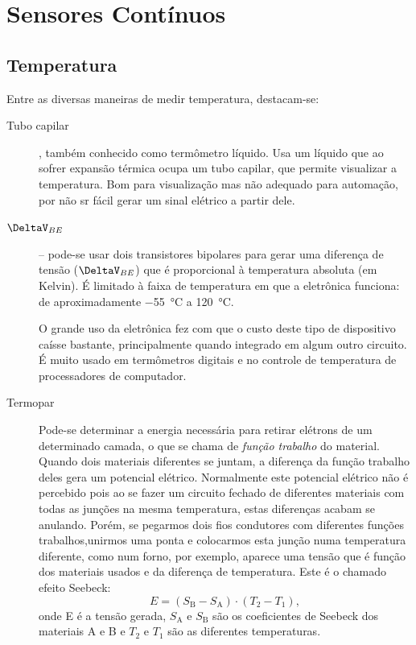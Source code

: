 \section{Sensores Contínuos}

\subsection{Temperatura}
Entre as diversas maneiras de medir temperatura, destacam-se:
\begin{description}
  \item[Tubo capilar], também conhecido como termômetro líquido. Usa um líquido que ao sofrer expansão térmica ocupa um tubo capilar, que permite visualizar a temperatura. Bom para visualização mas não adequado para automação, por não sr fácil gerar um sinal elétrico a partir dele.

  \item[$\DeltaV_{BE}$] -- pode-se usar dois transistores bipolares para gerar uma diferença de tensão ($\DeltaV_{BE}$) que é proporcional à temperatura absoluta (em Kelvin). É limitado à faixa de temperatura em que a eletrônica funciona: de aproximadamente \SI{-55}{\celsius} a \SI{120}{\celsius}.

  O grande uso da eletrônica fez com que o custo deste tipo de dispositivo caísse bastante, principalmente quando integrado em algum outro circuito. É muito usado em termômetros digitais e no controle de temperatura de processadores de computador.

  \item[Termopar] Pode-se determinar a energia necessária para retirar elétrons de um determinado camada, o que se chama de \emph{função trabalho} do material. Quando dois materiais diferentes se juntam, a diferença da função trabalho deles gera um potencial elétrico. Normalmente este potencial elétrico não é percebido pois ao se fazer um circuito fechado de diferentes materiais com todas as junções na mesma temperatura, estas diferenças acabam se anulando. Porém, se pegarmos dois fios condutores com diferentes funções trabalhos,unirmos uma ponta e colocarmos esta junção numa temperatura diferente, como num forno, por exemplo, aparece uma tensão que é função dos materiais usados e da diferença de temperatura. Este é o chamado efeito Seebeck:
  \[
E = (S_\mathrm{B} - S_\mathrm{A}) \cdot (T_2 - T_1),
  \]
  onde E é a tensão gerada, $S_\mathrm{A}$ e $S_\mathrm{B}$ são os coeficientes de Seebeck dos materiais A e B e $T_2$ e $T_1$ são as diferentes temperaturas.


\end{description}
